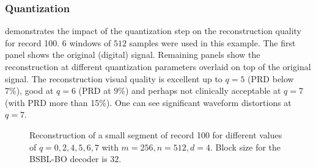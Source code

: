 \subsubsection{Quantization}

 demonstrates the impact of the
quantization step on the reconstruction quality
for record 100. $6$ windows of $512$ samples
were used in this example. The first panel
shows the original (digital) signal. Remaining
panels show the reconstruction at different
quantization parameters overlaid on top of the
original signal.
The reconstruction visual quality is excellent
up to $q=5$ (PRD below 7\%), good at $q=6$ (PRD at 9\%)
and perhaps not clinically acceptable at $q=7$
(with PRD more than 15\%).
One can see significant waveform distortions at $q=7$.



\begin{figure*}[!ht]
\centering 
\caption{Reconstruction of a small segment of record 100
for different values of $q=0,2,4,5,6,7$ with $m=256,n=512,d=4$.
Block size for the BSBL-BO decoder is $32$.}
\label{fig:100:q:0-7}
\end{figure*}


\FloatBarrier